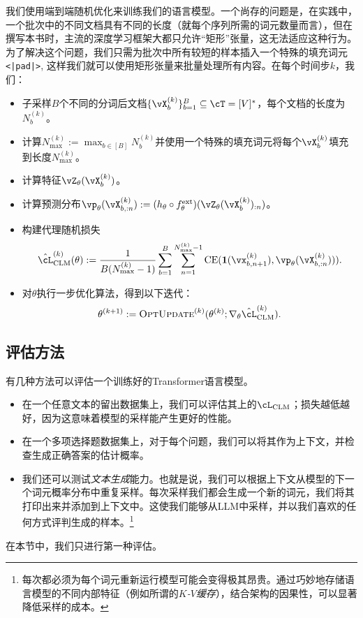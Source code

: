 \documentclass[../../book-main.tex]{subfiles}
\begin{document}
我们使用端到端随机优化来训练我们的语言模型。一个尚存的问题是，在实践中，一个批次中的不同文档具有不同的长度（就每个序列所需的词元数量而言），但在撰写本书时，主流的深度学习框架大都只允许“矩形”张量，这无法适应这种行为。为了解决这个问题，我们只需为批次中所有较短的样本插入一个特殊的填充词元\texttt{<|pad|>}, 这样我们就可以使用矩形张量来批量处理所有内容。在每个时间步\(k\)，我们：
\begin{itemize}
    \item 子采样\(B\)个不同的分词后文档\(\{\vX_{b}^{(k)}\}_{b = 1}^{B} \subseteq \cT = [V]^{*}\)，每个文档的长度为\(N_{b}^{(k)}\)。
    \item 计算\(N_{\max}^{(k)} := \max_{b \in [B]}N_{b}^{(k)}\)并使用一个特殊的填充词元将每个\(\vX_{b}^{(k)}\)填充到长度\(N_{\max}^{(k)}\)。
    \item 计算特征\(\vZ_{\theta}(\vX_{b}^{(k)})\)。
    \item 计算预测分布\(\vp_{\theta}(\vX_{b, :n}^{(k)}) := (h_{\theta} \circ f_{\theta}^{\ext})(\vZ_{\theta}(\vX_{b}^{(k)})_{:n})\)。
    \item 构建代理随机损失
    \begin{equation}
        \hat{\cL}_{\mathrm{CLM}}^{(k)}(\theta) := \frac{1}{B(N_{\max}^{(k)} - 1)}\sum_{b = 1}^{B}\sum_{n = 1}^{N_{\max}^{(k)}-1}\CE(\vone(\vx_{b, n + 1}^{(k)}), \vp_{\theta}(\vX_{b, :n}^{(k)}))).
    \end{equation}
    \item 对\(\theta\)执行一步优化算法，得到以下迭代：
    \begin{equation}
        \theta^{(k + 1)} := \textsc{OptUpdate}^{(k)}(\theta^{(k)}; \nabla_{\theta}\hat{\cL}_{\mathrm{CLM}}^{(k)}).
    \end{equation}
\end{itemize}

\subsection{评估方法} \label{sub:clm_text_evals}

有几种方法可以评估一个训练好的Transformer语言模型。
\begin{itemize}
    \item 在一个任意文本的留出数据集上，我们可以评估其上的\(\cL_{\mathrm{CLM}}\)；损失越低越好，因为这意味着模型的采样能产生更好的性能。
    \item 在一个多项选择题数据集上，对于每个问题，我们可以将其作为上下文，并检查生成正确答案的估计概率。
    \item 我们还可以测试\textit{文本生成}能力。也就是说，我们可以根据上下文从模型的下一个词元概率分布中重复采样。每次采样我们都会生成一个新的词元，我们将其打印出来并添加到上下文中。这使我们能够从LLM中采样，并以我们喜欢的任何方式评判生成的样本。\footnote{每次都必须为每个词元重新运行模型可能会变得极其昂贵。通过巧妙地存储语言模型的不同内部特征（例如所谓的\textit{\(K\)-\(V\)缓存}），结合架构的因果性，可以显著降低采样的成本。}
\end{itemize}
在本节中，我们只进行第一种评估。
\end{document}
